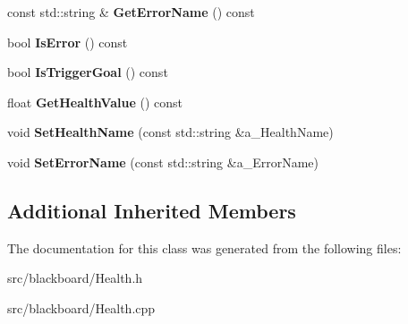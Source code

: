\begin{DoxyCompactItemize}
\mbox{\label{class_health_a2958b97f36daee3874d223c457298688}} 
const std\+::string \& {\bfseries Get\+Error\+Name} () const
\item 
\mbox{\label{class_health_a097530321958cc6d9382f405abeee43b}} 
bool {\bfseries Is\+Error} () const
\item 
\mbox{\label{class_health_a2b1700de542c791c707bd12be7f491e3}} 
bool {\bfseries Is\+Trigger\+Goal} () const
\item 
\mbox{\label{class_health_a7268fea88a2d3ce66ce9fc8a9b24c58c}} 
float {\bfseries Get\+Health\+Value} () const
\item 
\mbox{\label{class_health_a5a3c5f86a9fdc804e1b3dd813ecb302c}} 
void {\bfseries Set\+Health\+Name} (const std\+::string \&a\+\_\+\+Health\+Name)
\item 
\mbox{\label{class_health_a41cc5338bbfbd2aad32a38cc0cc0c9f5}} 
void {\bfseries Set\+Error\+Name} (const std\+::string \&a\+\_\+\+Error\+Name)
\end{DoxyCompactItemize}
\subsection*{Additional Inherited Members}


The documentation for this class was generated from the following files\+:\begin{DoxyCompactItemize}
\item 
src/blackboard/Health.\+h\item 
src/blackboard/Health.\+cpp\end{DoxyCompactItemize}
